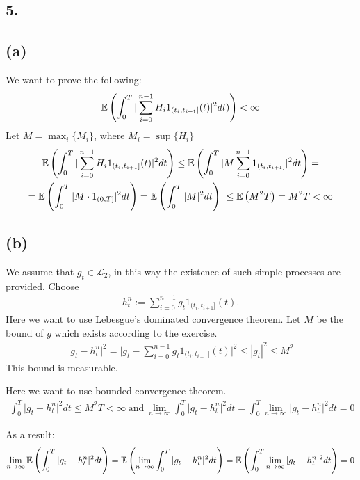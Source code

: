 \subsection*{5.}
\subsection*{(a)}
We want to prove the following:
\begin{gather*}
     \mathbb{E}\left( \int_0^T\vert \sum_{i=0}^{n-1} H_i 1_{(t_i, t_{i+1}]}(t)\vert^2 dt) \right) < \infty
\end{gather*}
Let $M=\max_i\{M_i\} $, where $M_i=\sup \{H_i\}$
\begin{gather*}
    \E{\int_0^T | \sum_{i=0}^{n-1} H_i 1_{(t_i, t_{i+1}]}(t)|^2 dt}\le
    \E{\int_0^T | M \sum_{i=0}^{n-1} 1_{(t_i, t_{i+1}]}|^2 dt} =\\
    =\E{ \int_0^T | M \cdot 1_{(0, T]}|^2 dt} =\E{\int_0^T | M |^2 dt} \ \le \E{M^2 T} = M^2 T < \infty
\end{gather*}

\subsection*{(b)}
We assume that $g_t \in \mathcal{L}_2$, in this way the existence of such simple processes are provided.
Choose 
\begin{gather*}
    h_t^n := \sum_{i=0}^{n-1} g_t 1_{(t_i, t_{i+1}]}(t).
\end{gather*}
Here we want to use Lebesgue's dominated convergence theorem. Let $M$ be the bound of $g$ which exists according to the exercise. 
\begin{gather*}
    \vert g_t-h_t^n\vert^2 = \vert g_t-\sum_{i=0}^{n-1} g_t 1_{(t_i, t_{i+1}]}(t)\vert^2 \le |g_t|^2 \le M^2 
\end{gather*}
This bound is measurable.

Here we want to use bounded convergence theorem. 
\begin{gather*}
    \int_0^T \vert g_t-h_t^n\vert^2 dt \le M^2 T < \infty ~\text{and}~ 
    \lim_{n\to \infty}\int_0^T \vert g_t-h_t^n\vert^2 dt = \int_0^T \lim_{n\to \infty}\vert g_t-h_t^n\vert^2 dt = 0
\end{gather*}
 
As a result: 
\begin{gather*}
    \lim_{n\to \infty}\mathbb{E}\left( \int_0^T \vert g_t-h_t^n\vert^2 dt \right) =  \mathbb{E}\left(   \lim_{n\to \infty}\int_0^T \vert g_t-h_t^n\vert^2 dt \right) = \mathbb{E}\left(   \int_0^T \lim_{n\to \infty} \vert g_t-h_t^n\vert^2 dt \right) = 0
\end{gather*}

